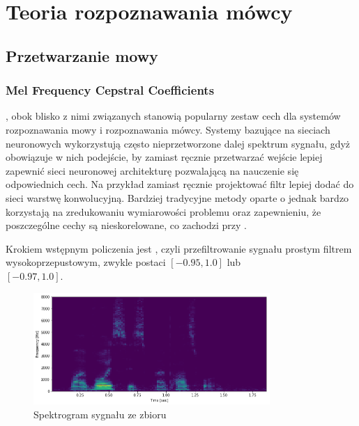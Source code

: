 \chapter{Teoria rozpoznawania mówcy}\label{chap:teoria}

\section{Przetwarzanie mowy}\label{sec:przetwarzanie_mowy}

\subsection{Mel Frequency Cepstral Coefficients}\label{sec:mfcc}

, obok blisko z nimi związanych  stanowią popularny zestaw
cech dla systemów rozpoznawania mowy i rozpoznawania mówcy. Systemy bazujące na sieciach
neuronowych wykorzystują często nieprzetworzone dalej spektrum sygnału, gdyż obowiązuje
w nich podejście, by zamiast ręcznie przetwarzać wejście lepiej zapewnić sieci neuronowej
architekturę pozwalającą na nauczenie się odpowiednich cech. Na przykład zamiast ręcznie
projektować filtr lepiej dodać do sieci warstwę konwolucyjną. Bardziej tradycyjne metody
oparte o  jednak bardzo korzystają na zredukowaniu wymiarowości problemu
oraz zapewnieniu, że poszczególne cechy są nieskorelowane, co zachodzi przy .

Krokiem wstępnym policzenia  jest , czyli przefiltrowanie sygnału
prostym filtrem wysokoprzepustowym, zwykle postaci $[-0.95, 1.0]$ lub \\ $[-0.97, 1.0]$.

\begin{figure}[H]
    \centering
    \includegraphics[width=0.8\textwidth]{images/2_1_a_example_spectrogram}
    \caption{Spektrogram sygnału  ze zbioru }
    \label{fig:2_1_a_example_spectrogram}
\end{figure}

